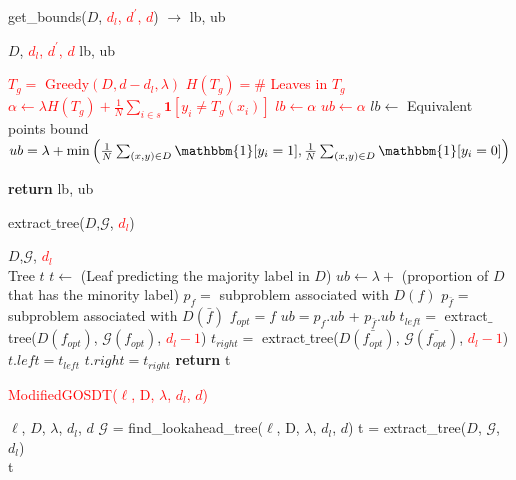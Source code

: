 \begin{algorithm}[H]
\caption{get\_bounds($D$, \textcolor{red}{$d_l$, $d^\prime$, $d$}) $\to$ lb, ub}
\begin{algorithmic}[1]
\REQUIRE $D$, \textcolor{red}{$d_l$, $d^\prime$, $d$} \COMMENT{\textcolor{commentgreen}{support, positive sample set, lookahead depth, current depth,  overall depth budget}}
\RETURN lb, ub \COMMENT{\textcolor{commentgreen}{Return Lower and Upper Bounds}}


\IF {\textcolor{red}{$d = d_l$}}
\STATE \textcolor{red}{$T_g = $ Greedy$(D,d-d_l,\lambda)$}
\STATE \textcolor{red}{$H(T_g) = \# $ Leaves in $T_g $}
\STATE \textcolor{red}{$\alpha\gets \lambda H(T_g) + \frac{1}{N}\sum_{i \in s} \mathbf{1}[y_i \neq T_g(x_i)]$}
\STATE \textcolor{red}{$lb \gets \alpha$}
\STATE \textcolor{red}{$ub \gets \alpha$}
    \STATE $lb \gets $ Equivalent points bound \cite{gosdt}
    \STATE $ub = \lambda + \min\Big(\frac{1}{N}\sum_{(x,y) \in D} \mathbbm{1}[y_i = 1], \frac{1}{N}\sum_{(x,y) \in D} \mathbbm{1}[y_i = 0]\Big)$
\ENDIF

\STATE \textbf{return} lb, ub
\end{algorithmic}
\end{algorithm}
\begin{algorithm}[H]
\caption{extract$\_$tree($D$,$\mathcal{G}$, \textcolor{red}{$d_l$})}
\begin{algorithmic}[1]
\REQUIRE $D$,$\mathcal{G}$, \textcolor{red}{$d_l$} \COMMENT{\textcolor{commentgreen}{Dataset, Dependency graph of search space, lookahead depth}}\\
\RETURN Tree $t$
\STATE $t \leftarrow $ (Leaf predicting the majority label in $D$)
\STATE $ub \leftarrow \lambda + $ (proportion of $D$ that has the minority label)
\IF {\textcolor{red}{$d_l > 1$}}
     \STATE $p_{f} = $ subproblem associated with $D(f)$
     \STATE $p_{\bar{f}} = $ subproblem associated with $D(\bar{f})$
        \STATE $f_{opt} = f$ \COMMENT{\textcolor{commentgreen}{Best Feature}}
        \STATE $ub = p_f.ub$ + $p_{\bar{f}}.ub$
     \ENDIF 
\ENDFOR
\STATE $t_{left} = $ extract$\_$tree($D(f_{opt} )$, $\mathcal{G}(f_{opt} )$, \textcolor{red}{$d_l-1$})
\STATE $t_{right} = $ extract$\_$tree($D(\bar{f_{opt} })$, $\mathcal{G}(\bar{f_{opt} })$, \textcolor{red}{$d_l-1$})
\STATE $t.left = t_{left}$
\STATE $t.right = t_{right}$
\ENDIF
\STATE \textbf{return} t
\end{algorithmic}
\end{algorithm}
\begin{algorithm}[H]
\caption{\textcolor{red}{ModifiedGOSDT($\ell$, D, $\lambda$, $d_l$, $d$)}}
\label{alg::gosdtmod}
\begin{algorithmic}[1]
\REQUIRE $\ell$, $D$, $\lambda$, $d_l$, $d$ \COMMENT{\textcolor{commentgreen}{loss function, samples, regularizer, lookahead depth, depth budget}}
\STATE $\mathcal{G}$ = \textrm{find\_lookahead\_tree}($\ell$, D, $\lambda$, $d_l$, $d$)
\STATE t = \textrm{extract\_tree}($D$, $\mathcal{G}$, $d_l$) \COMMENT{\textcolor{commentgreen}{Extracts the prefix of the found tree, without filling in the greedy splits}}\\
\RETURN t
\end{algorithmic}
\end{algorithm}